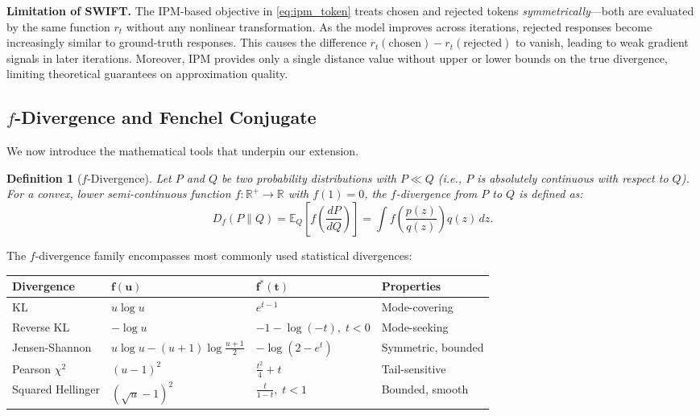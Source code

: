 \documentclass[11pt,a4paper]{article}
\newtheorem{definition}[theorem]{Definition}
\newcommand{\E}{\mathbb{E}}
\newcommand{\R}{\mathbb{R}}
\newcommand{\Df}{D_f}
\begin{document}
\textbf{Limitation of SWIFT.} The IPM-based objective in \eqref{eq:ipm_token} treats chosen and rejected tokens \emph{symmetrically}---both are evaluated by the same function $r_t$ without any nonlinear transformation. As the model improves across iterations, rejected responses become increasingly similar to ground-truth responses. This causes the difference $r_t(\text{chosen}) - r_t(\text{rejected})$ to vanish, leading to weak gradient signals in later iterations. Moreover, IPM provides only a single distance value without upper or lower bounds on the true divergence, limiting theoretical guarantees on approximation quality.

\subsection{$f$-Divergence and Fenchel Conjugate}
\label{subsec:f_div}

We now introduce the mathematical tools that underpin our extension.

\begin{definition}[$f$-Divergence]
\label{def:f_div}
Let $P$ and $Q$ be two probability distributions with $P \ll Q$ (i.e., $P$ is absolutely continuous with respect to $Q$). For a convex, lower semi-continuous function $f: \R^+ \to \R$ with $f(1) = 0$, the $f$-divergence from $P$ to $Q$ is defined as:
\begin{equation}
    \Df(P \| Q) = \E_Q \left[ f\!\left(\frac{dP}{dQ}\right) \right] = \int f\!\left(\frac{p(z)}{q(z)}\right) q(z)\, dz.
    \label{eq:f_div_def}
\end{equation}
\end{definition}

The $f$-divergence family encompasses most commonly used statistical divergences:

\begin{center}
\begin{tabular}{llll}
\toprule
\textbf{Divergence} & $\bm{f(u)}$ & $\bm{f^*(t)}$ & \textbf{Properties} \\
\midrule
KL & $u \log u$ & $e^{t-1}$ & Mode-covering \\
Reverse KL & $-\log u$ & $-1 - \log(-t),\; t < 0$ & Mode-seeking \\
Jensen-Shannon & $u\log u - (u{+}1)\log\frac{u+1}{2}$ & $-\log(2 - e^t)$ & Symmetric, bounded \\
Pearson $\chi^2$ & $(u-1)^2$ & $\frac{t^2}{4} + t$ & Tail-sensitive \\
Squared Hellinger & $(\sqrt{u} - 1)^2$ & $\frac{t}{1-t},\; t < 1$ & Bounded, smooth \\
\bottomrule
\end{tabular}
\end{center}
\end{document}
